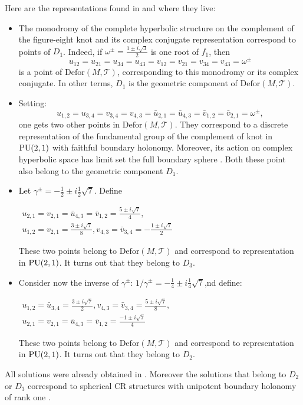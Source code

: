 Here are the representations found in \cite{FKR14} and where they live:
\begin{itemize}
  \item The monodromy of the complete hyperbolic structure on the complement of the figure-eight knot and its complex conjugate representation correspond to points of $D_1$. Indeed, if
  $\omega^{\pm} = \frac{1 \pm i \sqrt{3}}{2}$ is one root of $f_{1}$, then
  \[ u_{12} =u_{21} =u_{34} =u_{43} =v_{12} =v_{21} =v_{34} =v_{43} =
     \omega^{\pm} \]
  is a point of $\mathrm{Defor}(M,\mathcal T)$, corresponding to this monodromy or its complex conjugate. In other terms, $D_1$ is the geometric component of $\mathrm{Defor}(M,\mathcal T)$.
  
  \item Setting:
  \[ u_{1,2} =u_{3,4} =v_{3,4} =v_{4,3} = \bar{u}_{2,1} = \bar{u}_{4,3} =
     \bar{v}_{1,2} = \bar{v}_{2,1} = \omega^{\pm} , \]
     one gets two other points in $\mathrm{Defor}(M,\mathcal T)$.
  They correspond to a discrete representation of the fundamental
  group of the complement of knot in $\operatorname{PU} (2,1)$ with faithful boundary
  holonomy. Moreover, its action on complex hyperbolic space has limit set the
  full boundary sphere {\cite{falbeleight}}. Both these point also belong to the geometric component $D_1$.
  
  
  
  \item Let $\gamma^{\pm} =-
  \frac{1}{2} \pm i \frac{1}{2}  \sqrt{7}$. Define
  \begin{center}
    $\begin{array}{c}
      u_{2,1} =v_{2,1} = \bar{u}_{4,3} = \bar{v}_{1,2} = \frac{5\pm i
      \sqrt{7}}{4} ,\\
      u_{1,2} =v_{2,1} = \frac{3\pm i \sqrt{7}}{8} ,v_{4,3} = \bar{v}_{3,4} =-
      \frac{1\pm i \sqrt{7}}{2}
    \end{array}$
  \end{center}
  These two points belong to $\mathrm{Defor}(M,\mathcal T)$ and correspond to representation in $\operatorname{PU} (2,1)$. It turns out that they belong to $D_3$.
  \item Consider now the inverse of $\gamma^{\pm}$: $1/ \gamma^{\pm} =-
  \frac{1}{4} \pm i \frac{1}{4}  \sqrt{7}$,nd define:
  \begin{center}
    $\begin{array}{c}
      u_{1,2} = \bar{u}_{3,4} = \frac{3\pm i \sqrt{7}}{2} ,v_{4,3} =
      \bar{v}_{3,4} = \frac{5\pm i \sqrt{7}}{8} ,\\
      u_{2,1} =v_{2,1} = \bar{u}_{4,3} = \bar{v}_{1,2} = \frac{-1\pm i
      \sqrt{7}}{4}
    \end{array}$
  \end{center}  
  These two points belong to $\mathrm{Defor}(M,\mathcal T)$ and correspond to representation in $\operatorname{PU} (2,1)$. It turns out that they belong to $D_2$.
  
  
\end{itemize}
All solutions were already obtained in {\cite{falbeleight}}. Moreover the solutions that belong to $D_2$ or $D_3$ correspond to spherical CR structures with
unipotent boundary holonomy of rank one {\cite{DF}}.

